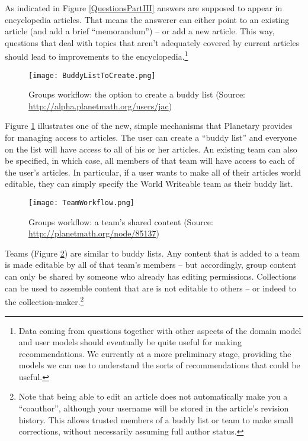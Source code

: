 \documentclass[12pt]{article}
\begin{document}
As indicated in Figure \ref{QuestionsPartIII} answers are supposed to appear in encyclopedia articles.  That means the answerer can either point to an existing article (and add a brief ``memorandum'') -- or add a new article.  This way, questions that deal with topics that aren't adequately covered by current articles should lead to improvements to the encyclopedia.\footnote{Data coming from questions together with other aspects of the domain model and user models should eventually be quite useful for making recommendations.  We currently at a more preliminary stage, providing the models we can use to understand the sorts of recommendations that could be useful.}

\begin{figure}[h]
\begin{center}
\texttt{[image: BuddyListToCreate.png]}
\end{center}
\caption{Groups workflow: the option to create a buddy list (Source: \url{http://alpha.planetmath.org/users/jac})\label{BuddyListToCreate}}
\end{figure}

Figure \ref{BuddyListToCreate} illustrates one of the new, simple mechanisms that Planetary provides for managing access to articles.  The user can create a ``buddy list'' and everyone on the list will have access to all of his or her articles.  An existing team can also be specified, in which case, all members of that team will have access to each of the user's articles.  In particular, if a user wants to make all of their articles world editable, they can simply specify the World Writeable team as their buddy list.

\begin{figure}[h]
\begin{center}
\texttt{[image: TeamWorkflow.png]}
\end{center}
\caption{Groups workflow: a team's shared content (Source: \url{http://planetmath.org/node/85137})\label{TeamWorkflow}}
\end{figure}

Teams (Figure \ref{TeamWorkflow}) are similar to buddy lists.  Any content that is added to a team is made editable by all of that team's members -- but accordingly, group content can only be shared by someone who already has editing permissions.  Collections can be used to assemble content that are is not editable to others -- or indeed to the collection-maker.\footnote{Note that being able to edit an article does not automatically make you a ``coauthor'', although your username will be stored in the article's revision history.  This allows trusted members of a buddy list or team to make small corrections, without necessarily assuming full author status.}
\end{document}

